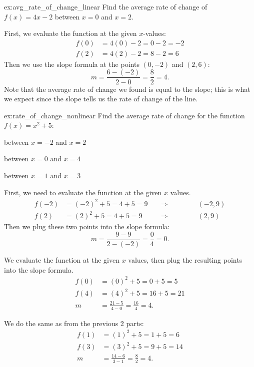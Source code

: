 \documentclass{article}
\begin{document}
\begin{example}{}{ex:avg_rate_of_change_linear}
    Find the average rate of change of $f(x)=4x-2$ between $x=0$ and $x=2$.
\end{example}
\begin{solution}
    First, we evaluate the function at the given $x$-values:
    \begin{align*}
        f(0)&=4(0)-2=0-2=-2\\
        f(2)&=4(2)-2=8-2=6
    \end{align*}
    Then we use the slope formula at the points $(0,-2)$ and $(2,6)$:
    \[m=\frac{6-(-2)}{2-0}=\frac{8}{2}=4.\]
    Note that the average rate of change we found is equal to the slope; this is what we expect since the slope tells us the rate of change of the line.
\end{solution}

\begin{example}{}{ex:rate_of_change_nonlinear}
    Find the average rate of change for the function $f(x)=x^2+5$:
    \begin{problem}
        \item between $x=-2$ and $x=2$
        \item between $x=0$ and $x=4$
        \item between $x=1$ and $x=3$
    \end{problem}
\end{example}
\begin{solution}
    \begin{problem}
        \item First, we need to evaluate the function at the given $x$ values.
        \begin{align*}
            f(-2)&=(-2)^2+5=4+5=9 &&\Rightarrow \qquad\qquad(-2,9)\\
            f(2)&=(2)^2+5=4+5=9 &&\Rightarrow \qquad\qquad(2,9)
        \end{align*}
        Then we plug these two points into the slope formula:
        \[m=\frac{9-9}{2-(-2)}=\frac{0}{4}=0.\]
        \item We evaluate the function at the given $x$ values, then plug the resulting points into the slope formula.
        \begin{align*}
            f(0)&=(0)^2+5=0+5=5\\
            f(4)&=(4)^2+5=16+5=21\\
            m&=\frac{21-5}{4-0}=\frac{16}{4}=4.
        \end{align*}
        \item We do the same as from the previous 2 parts:
        \begin{align*}
            f(1)&=(1)^2+5=1+5=6\\
            f(3)&=(3)^2+5=9+5=14\\
            m&=\frac{14-6}{3-1}=\frac{8}{2}=4.
        \end{align*}
    \end{problem}
\end{solution}
\end{document}
